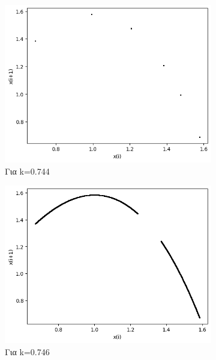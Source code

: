 \begin{figure}[h!]
\begin{subfigure}[b]{0.4\textwidth}
		\includegraphics[width=\textwidth]{LateX images/graphs q14/g19}
		\caption{Για k=0.744}
		\label{f:k76}
	\end{subfigure}
	\hfill
	\begin{subfigure}[b]{0.4\textwidth}
		\centering
		\includegraphics[width=\textwidth]{LateX images/graphs q14/g20}
		\caption{Για k=0.746}
		\label{f:k77}
	\end{subfigure}
	\hfill
	\begin{subfigure}[b]{0.4\textwidth}
		\centering

\end{subfigure}
\end{figure}
